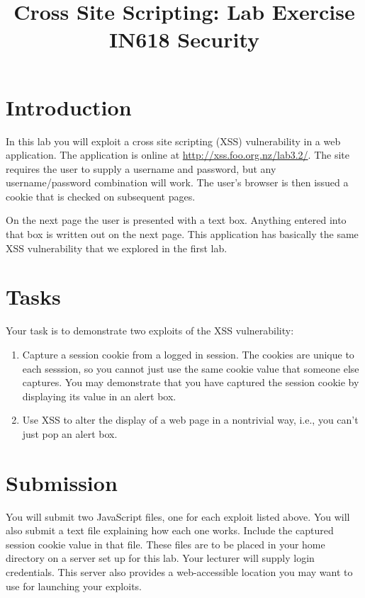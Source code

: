 \documentclass{article}
\begin{document}
\title{Cross Site Scripting: Lab Exercise\\ IN618 Security}
\date{}
\maketitle

\section*{Introduction}
In this lab you will exploit a cross site scripting (XSS) vulnerability in a
web application.  The application is online at \url{http://xss.foo.org.nz/lab3.2/}.  The
site requires the user to supply a username and password, but any username/password combination
will work.  The user's browser is then issued a cookie that is checked on subsequent pages.

On the next page the user is presented with a text box.  Anything entered into that
box is written out on the next page.  This application has basically the same XSS
vulnerability that we explored in the first lab.

\section{Tasks}
Your task is to demonstrate two exploits of the XSS vulnerability:

\begin{enumerate}
	\item Capture a session cookie from a logged in session.
		The cookies are unique to each sesssion, so you 
		cannot just use the same cookie value that someone
		else captures. You may demonstrate that you have captured the session
		cookie by displaying its value in an alert box.
	\item Use XSS to alter the display of a web page in a nontrivial 
		way, i.e., you can't just pop an alert box.
\end{enumerate}

\section{Submission}
You will submit two JavaScript files, one for each exploit listed above. You
will also submit a text file explaining how each one works.  Include the captured session 
cookie value in that file. These files are to be placed in your home directory on a server set up for this lab.
Your lecturer will supply login credentials. This server also provides a web-accessible location you may want to use for launching your exploits.
\end{document}
